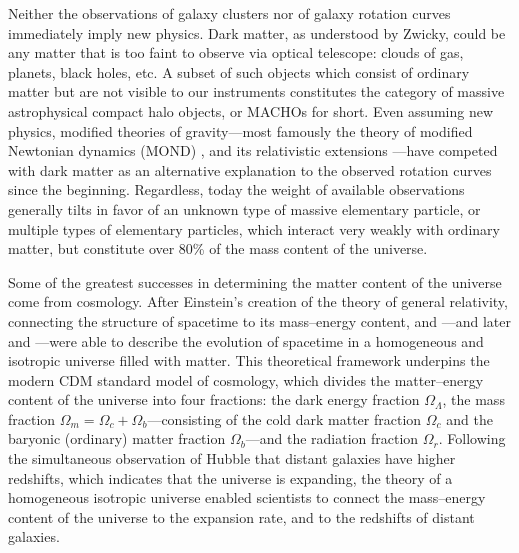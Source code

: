 \documentclass[b5paper, 10pt, twoside]{book}
\begin{document}
Neither the observations of galaxy clusters nor of galaxy rotation curves immediately imply new physics. Dark matter, as understood by Zwicky, could be any matter that is too faint to observe via optical telescope: clouds of gas, planets, black holes, etc. A subset of such objects which consist of ordinary matter but are not visible to our instruments constitutes the category of massive astrophysical compact halo objects, or MACHOs for short. Even assuming new physics, modified theories of gravity---most famously the theory of modified Newtonian dynamics (MOND) \parencite{Milgrom1983}, and its relativistic extensions \parencites{Bekenstein2004, Milgrom2009, SkordisZlosnik2021}---have competed with dark matter as an alternative explanation to the observed rotation curves since the beginning. Regardless, today the weight of available observations generally tilts in favor of an unknown type of massive elementary particle, or multiple types of elementary particles, which interact very weakly with ordinary matter, but constitute over 80\% of the mass content of the universe.

Some of the greatest successes in determining the matter content of the universe come from cosmology. After Einstein's creation of the theory of general relativity, connecting the structure of spacetime to its mass--energy content, \textcites{Friedmann1922, Friedmann1924} and \textcite{Lemaitre1927}---and later \textcites{Robertson1935, Robertson1936a, Robertson1936b} and \textcite{Walker1937}---were able to describe the evolution of spacetime in a homogeneous and isotropic universe filled with matter. This theoretical framework underpins the modern \textLambda{}CDM standard model of cosmology, which divides the matter--energy content of the universe into four fractions: the dark energy fraction $\Omega_\Lambda$, the mass fraction $\Omega_m=\Omega_c+\Omega_b$---consisting of the cold dark matter fraction $\Omega_c$ and the baryonic (ordinary) matter fraction $\Omega_b$---and the radiation fraction $\Omega_r$. Following the simultaneous observation of Hubble that distant galaxies have higher redshifts, which indicates that the universe is expanding, the theory of a homogeneous isotropic universe enabled scientists to connect the mass--energy content of the universe to the expansion rate, and to the redshifts of distant galaxies.
\end{document}
